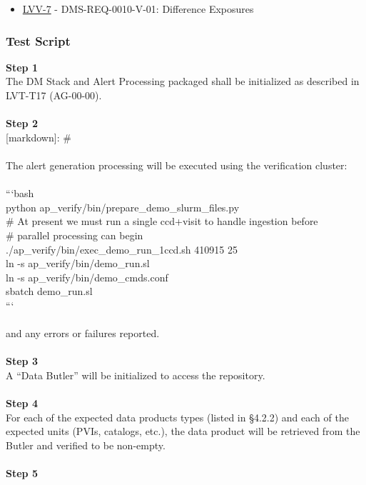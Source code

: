 \begin{itemize}
\tightlist
\item
  \href{https://jira.lsstcorp.org/browse/LVV-7}{LVV-7} -
  DMS-REQ-0010-V-01: Difference Exposures
\end{itemize}

\hypertarget{test-script-13}{%
\subsubsection{Test Script}\label{test-script-13}}

\textbf{Step 1}\\
The DM Stack and Alert Processing packaged shall be initialized as
described in LVT-T17 (AG-00-00).\\
~\\
\textbf{Step 2}\\
{[}markdown{]}: \#\\
~\\
The alert generation processing will be executed using the verification
cluster:\\
~\\
```bash\\
python ap\_verify/bin/prepare\_demo\_slurm\_files.py\\
\# At present we must run a single ccd+visit to handle ingestion
before\\
\# parallel processing can begin\\
./ap\_verify/bin/exec\_demo\_run\_1ccd.sh 410915 25\\
ln -s ap\_verify/bin/demo\_run.sl\\
ln -s ap\_verify/bin/demo\_cmds.conf\\
sbatch demo\_run.sl\\
```\\
~\\
and any errors or failures reported.\\
~\\
\textbf{Step 3}\\
A ``Data Butler'' will be initialized to access the repository.\\
~\\
\textbf{Step 4}\\
For each of the expected data products types (listed in §4.2.2) and each
of the expected units (PVIs, catalogs, etc.), the data product will be
retrieved from the Butler and verified to be non-empty.\\
~\\
\textbf{Step 5}\\
